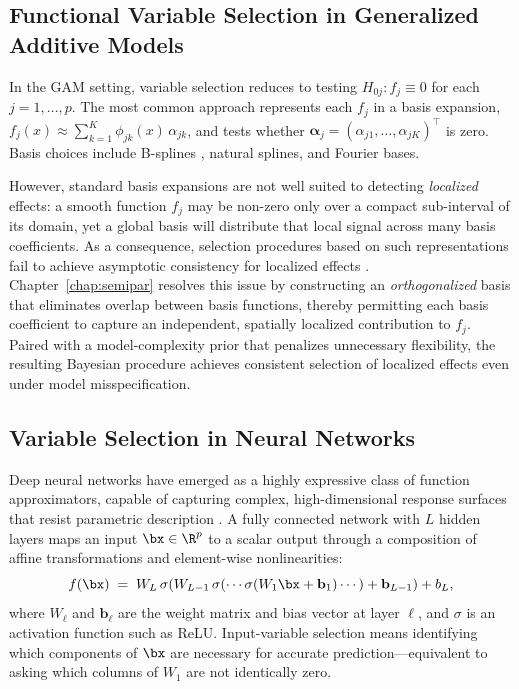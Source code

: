 \subsection{Functional Variable Selection in Generalized Additive Models}
\label{subsec:functional-vs}

In the GAM setting, variable selection reduces to testing
$H_{0j}: f_j \equiv 0$ for each $j = 1,\ldots,p$. The most common approach
represents each $f_j$ in a basis expansion,
$f_j(x) \approx \sum_{k=1}^{K} \phi_{jk}(x)\,\alpha_{jk}$,
and tests whether $\bm{\alpha}_j = (\alpha_{j1},\ldots,\alpha_{jK})^{\top}$
is zero. Basis choices include B-splines \citep{eilers1996bsplines},
natural splines, and Fourier bases.

However, standard basis expansions are not well suited to detecting
\emph{localized} effects: a smooth function $f_j$ may be non-zero only over
a compact sub-interval of its domain, yet a global basis will distribute
that local signal across many basis coefficients. As a consequence,
selection procedures based on such representations fail to achieve
asymptotic consistency for localized effects \citep{rossell2025semiparametric}.
Chapter~\ref{chap:semipar} resolves this issue by constructing an
\emph{orthogonalized} basis that eliminates overlap between basis functions,
thereby permitting each basis coefficient to capture an independent,
spatially localized contribution to $f_j$. Paired with a model-complexity
prior that penalizes unnecessary flexibility, the resulting Bayesian
procedure achieves consistent selection of localized effects even under
model misspecification.

\subsection{Variable Selection in Neural Networks}
\label{subsec:nn-vs}

Deep neural networks have emerged as a highly expressive class of function
approximators, capable of capturing complex, high-dimensional response
surfaces that resist parametric description \citep{goodfellow2016deep}.
A fully connected network with $L$ hidden layers maps an input
$\bx \in \R^p$ to a scalar output through a composition of affine
transformations and element-wise nonlinearities:
\begin{equation}
  f(\bx)
  \;=\;
  W_L \,\sigma\!\left(W_{L-1}\,\sigma\!\left(\cdots
  \sigma(W_1 \bx + \mathbf{b}_1) \cdots\right)
  + \mathbf{b}_{L-1}\right) + b_L,
  \label{eq:dnn}
\end{equation}
where $W_\ell$ and $\mathbf{b}_\ell$ are the weight matrix and bias
vector at layer $\ell$, and $\sigma$ is an activation function such as
ReLU. Input-variable selection means identifying which components of
$\bx$ are necessary for accurate prediction---equivalent to asking which
columns of $W_1$ are not identically zero.

